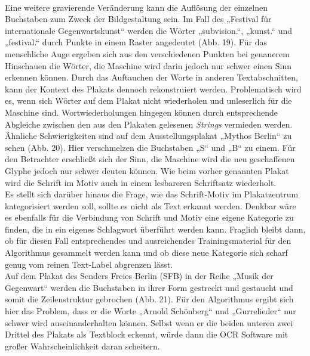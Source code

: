 \documentclass[a4paper,12pt,ngerman]{article}
\begin{document}
\\
Eine weitere gravierende Veränderung kann die Auflösung der einzelnen Buchstaben zum Zweck der Bildgestaltung sein. Im Fall des „Festival für internationale Gegenwartskunst“ werden die Wörter „subvision.“, „kunst.“ und „festival.“ durch Punkte in einem Raster angedeutet (Abb. 19). Für das menschliche Auge ergeben sich aus den verschiedenen Punkten bei genauerem Hinschauen die Wörter, die Maschine wird darin jedoch nur schwer einen Sinn erkennen können. Durch das Auftauchen der Worte in anderen Textabschnitten, kann der Kontext des Plakats dennoch rekonstruiert werden. Problematisch wird es, wenn sich Wörter auf dem Plakat nicht wiederholen und unleserlich für die Maschine sind. Wortwiederholungen hingegen können durch entsprechende Abgleiche zwischen den aus den Plakaten gelesenen \textit{Strings} vermieden werden.\\
Ähnliche Schwierigkeiten sind auf dem Ausstellungsplakat „Mythos Berlin“ zu sehen (Abb. 20). Hier verschmelzen die Buchstaben „S“ und „B“ zu einem. Für den Betrachter erschließt sich der Sinn, die Maschine wird die neu geschaffenen Glyphe jedoch nur schwer deuten können. Wie beim vorher genannten Plakat wird die Schrift im Motiv auch in einem lesbareren Schriftsatz wiederholt.\\
Es stellt sich darüber hinaus die Frage, wie das Schrift-Motiv im Plakatzentrum kategorisiert werden soll, sollte es nicht als Text erkannt werden. Denkbar wäre es ebenfalls für die Verbindung von Schrift und Motiv eine eigene Kategorie zu finden, die in ein eigenes Schlagwort überführt werden kann. Fraglich bleibt dann, ob für diesen Fall entsprechendes und ausreichendes Trainingsmaterial für den Algorithmus gesammelt werden kann und ob diese neue Kategorie sich scharf genug vom reinen Text-Label abgrenzen lässt.\\
Auf dem Plakat des Senders Freies Berlin (SFB) in der Reihe „Musik der Gegenwart“ werden die Buchstaben in ihrer Form gestreckt und gestaucht und somit die Zeilenstruktur gebrochen (Abb. 21). Für den Algorithmus ergibt sich hier das Problem, dass er die Worte „Arnold Schönberg“ und „Gurrelieder“ nur schwer wird auseinanderhalten können. Selbst wenn er die beiden unteren zwei Drittel des Plakats als Textblock erkennt, würde dann die OCR Software mit großer Wahrscheinlichkeit daran scheitern. \\
\\
\end{document}
